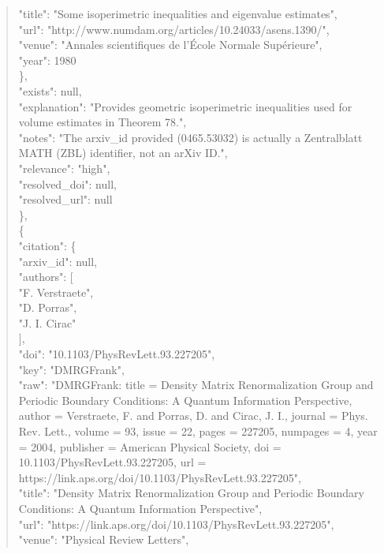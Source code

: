 \documentclass[11pt]{article}
\begin{document}
\begin{quote}
        "title": "Some isoperimetric inequalities and eigenvalue estimates",\\
        "url": "http://www.numdam.org/articles/10.24033/asens.1390/",\\
        "venue": "Annales scientifiques de l'École Normale Supérieure",\\
        "year": 1980\\
      \},\\
      "exists": null,\\
      "explanation": "Provides geometric isoperimetric inequalities used for volume estimates in Theorem 78.",\\
      "notes": "The arxiv\_id provided (0465.53032) is actually a Zentralblatt MATH (ZBL) identifier, not an arXiv ID.",\\
      "relevance": "high",\\
      "resolved\_doi": null,\\
      "resolved\_url": null\\
    \},\\
    \{\\
      "citation": \{\\
        "arxiv\_id": null,\\
        "authors": [\\
          "F. Verstraete",\\
          "D. Porras",\\
          "J. I. Cirac"\\
        ],\\
        "doi": "10.1103/PhysRevLett.93.227205",\\
        "key": "DMRGFrank",\\
        "raw": "DMRGFrank: title = Density Matrix Renormalization Group and Periodic Boundary Conditions: A Quantum Information Perspective, author = Verstraete, F. and Porras, D. and Cirac, J. I., journal = Phys. Rev. Lett., volume = 93, issue = 22, pages = 227205, numpages = 4, year = 2004, publisher = American Physical Society, doi = 10.1103/PhysRevLett.93.227205, url = https://link.aps.org/doi/10.1103/PhysRevLett.93.227205",\\
        "title": "Density Matrix Renormalization Group and Periodic Boundary Conditions: A Quantum Information Perspective",\\
        "url": "https://link.aps.org/doi/10.1103/PhysRevLett.93.227205",\\
        "venue": "Physical Review Letters",\\

\end{quote}
\end{document}
